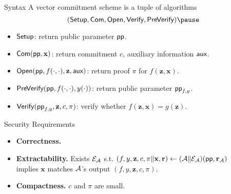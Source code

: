\begin{frame}{Syntax}
	A vector commitment scheme is a tuple of algorithms
	\begin{equation*}
		(\Setup, \Com, \Open, \Verify, \PreVerify)\pause
	\end{equation*}
	
	\begin{itemize}
		\item$\textsf{Setup}$: return public parameter $\textsf{pp}$.\pause
		\item$\textsf{Com}(\textsf{pp}, \mathbf{x})$: return commitment $c$, auxiliary information $\textsf{aux}$.\pause
		\item$\textsf{Open}(\textsf{pp}, f(\cdot, \cdot), \mathbf{z}, \textsf{aux})$: return proof $\pi$ for $f(\mathbf{z}, \mathbf{x})$. \pause
		\item$\textsf{PreVerify}(\textsf{pp}, f(\cdot, \cdot), y(\cdot))$: return public parameter $\textsf{pp}_{f, y}$.\pause
		\item$\textsf{Verify}(\textsf{pp}_{f, y}, \mathbf{z}, c, \pi)$: verify whether $f(\mathbf{z}, \mathbf{x}) = g(\mathbf{z})$.
	\end{itemize}
\end{frame}

\begin{frame}{Security Requirements}
	\begin{itemize}
		\item \textbf{Correctness.}\pause
		\item \textbf{Extractability.} Exists $\mathcal{E}_\mathcal{A}$ s.t.  $\left(f, y, \mathbf{z}, c, \pi \Vert \mathbf{x}, \mathbf{r}\right) \leftarrow (\mathcal{A}\Vert \mathcal{E}_\mathcal{A})(\textsf{pp}, \mathbf{r}_\mathcal{A})$\pause\\ implies $\mathbf{x}$ matches $\mathcal{A}$'s output $(f, y, \mathbf{z}, c, \pi)$.\pause
		\item \textbf{Compactness.} $c$ and $\pi$ are small.
	\end{itemize}
\end{frame}